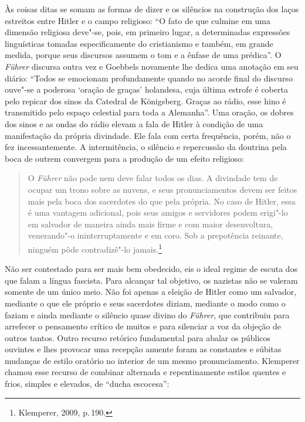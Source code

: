 Às coisas ditas se somam as formas de dizer e os silêncios na construção
dos laços estreitos entre Hitler e o campo religioso: ``O fato de que
culmine em uma dimensão religiosa deve"-se, pois, em primeiro lugar, a
determinadas expressões linguísticas tomadas especificamente do
cristianismo e também, em grande medida, porque seus discursos assumem o
tom e a ênfase de uma prédica''. O \emph{Führer} discursa outra vez e
Goebbels novamente lhe dedica uma anotação em seu diário: ``Todos se
emocionam profundamente quando no acorde final do discurso ouve"-se a
poderosa `oração de graças' holandesa, cuja última estrofe é coberta
pelo repicar dos sinos da Catedral de Königsberg. Graças ao rádio, esse
hino é transmitido pelo espaço celestial para toda a Alemanha''. Uma
oração, os dobres dos sinos e as ondas do rádio elevam a fala de Hitler
à condição de uma manifestação da própria divindade. Ele fala com certa
frequência, porém, não o fez incessantemente. A intermitência, o
silêncio e repercussão da doutrina pela boca de outrem convergem para a
produção de um efeito religioso:

\begin{quote}
O \emph{Führer} não pode nem deve falar todos os dias. A divindade tem
de ocupar um trono sobre as nuvens, e seus pronunciamentos devem ser
feitos mais pela boca dos sacerdotes do que pela própria. No caso de
Hitler, essa é uma vantagem adicional, pois seus amigos e servidores
podem erigi"-lo em salvador de maneira ainda mais firme e com maior
desenvoltura, venerando"-o ininterruptamente e em coro. Sob a prepotência
reinante, ninguém pôde contradizê"-lo jamais.\footnote{Klemperer, 2009,
  p.\,190.}
\end{quote}

Não ser contestado para ser mais bem obedecido, eis o ideal regime de
escuta dos que falam a língua fascista. Para alcançar tal objetivo, os
nazistas não se valeram somente de um único meio. Não foi apenas a
eleição de Hitler como um salvador, mediante o que ele próprio e seus
sacerdotes diziam, mediante o modo como o faziam e ainda mediante o
silêncio quase divino do \emph{Führer}, que contribuiu para arrefecer o
pensamento crítico de muitos e para silenciar a voz da objeção de outros
tantos. Outro recurso retórico fundamental para abalar os públicos
ouvintes e lhes provocar uma recepção anuente foram as constantes e
súbitas mudanças de estilo oratório no interior de um mesmo
pronunciamento. Klemperer chamou esse recurso de combinar alternada e
repentinamente estilos quentes e frios, simples e elevados, de ``ducha
escocesa'':

